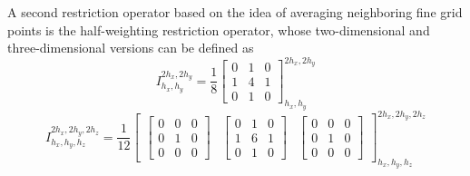 A second restriction operator based on the idea of averaging neighboring fine grid points is the half-weighting restriction operator, whose two-dimensional and three-dimensional versions can be defined as
\begin{equation}
	I^{2h_x,2h_y}_{h_x, h_y} = \frac{1}{8}
	\begin{bmatrix}
		0 & 1 & 0 \\
		1 & 4 & 1 \\
		0 & 1 & 0
	\end{bmatrix}^{2h_x, 2h_y}_{h_x, h_y}
\end{equation} 
\begin{equation}
	I^{2h_x, 2h_y, 2h_z}_{h_x, h_y, h_z} = 
\frac{1}{12} \begin{bmatrix}
	\begin{bmatrix}
		0& 0 & 0 \\
		0 & 1 & 0 \\
		0& 0 & 0
	\end{bmatrix}
 &		\begin{bmatrix}
 	0 & 1 & 0 \\
 	1 & 6 & 1 \\
 	0 & 1 & 0
 \end{bmatrix} &
	\begin{bmatrix}
		0& 0 & 0 \\
		0 & 1 & 0 \\
		0& 0 & 0
	\end{bmatrix}
\end{bmatrix}^{2h_x, 2h_y, 2h_z}_{h_x, h_y, h_z}
\end{equation} 
